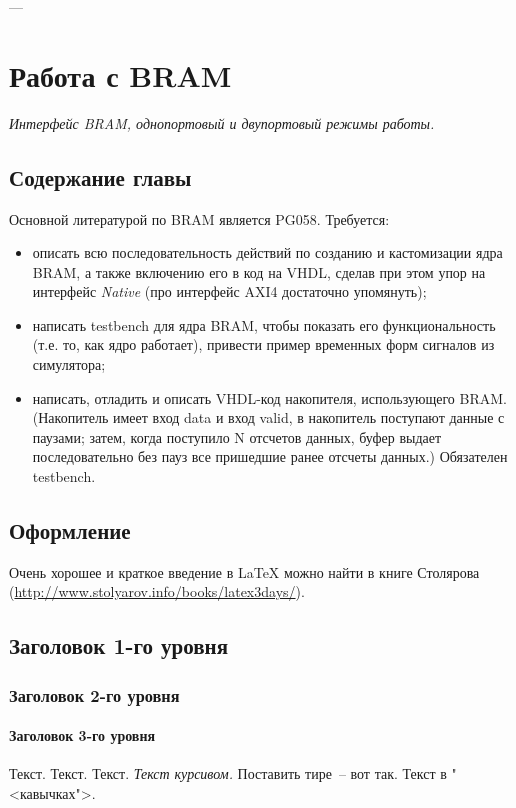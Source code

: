 ---
\chapter{Работа с BRAM}

\emph{Интерфейс BRAM, однопортовый и двупортовый режимы работы.}

\section{Содержание главы}

Основной литературой по BRAM является PG058. Требуется:
\begin{itemize}
\item описать всю последовательность действий по созданию и кастомизации ядра BRAM, а также включению его в код на VHDL, сделав при этом упор на интерфейс \emph{Native} (про интерфейс AXI4 достаточно упомянуть);
\item написать testbench для ядра BRAM, чтобы показать его функциональность (т.е. то, как ядро работает), привести пример временных форм сигналов из симулятора;
\item написать, отладить и описать VHDL-код накопителя, использующего BRAM. (Накопитель имеет вход data и вход valid, в накопитель поступают данные с паузами; затем, когда поступило N отсчетов данных, буфер выдает последовательно без пауз все пришедшие ранее отсчеты данных.) Обязателен testbench.
\end{itemize}

\section{Оформление}

Очень хорошее и краткое введение в LaTeX можно найти в книге Столярова (\href{url}{http://www.stolyarov.info/books/latex3days/}).

\section{Заголовок 1-го уровня}
\subsection{Заголовок 2-го уровня}
\subsubsection{Заголовок 3-го уровня}

Текст. Текст. Текст. \emph{Текст курсивом.} Поставить тире~-- вот так. Текст в "<кавычках">.

